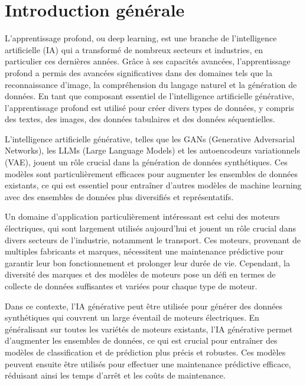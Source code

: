 \chapter*{Introduction générale}
\label{chap:introduction}

L'apprentissage profond, ou deep learning, est une branche de l'intelligence
artificielle (IA) qui a transformé de nombreux secteurs et industries, en
particulier ces dernières années. Grâce à ses capacités avancées,
l'apprentissage profond a permis des avancées significatives dans des domaines
tels que la reconnaissance d'image, la compréhension du langage naturel et la
génération de données. En tant que composant essentiel de l'intelligence
artificielle générative, l'apprentissage profond est utilisé pour créer divers
types de données, y compris des textes, des images, des données tabulaires et
des données séquentielles.

\medskip

L'intelligence artificielle générative, telles que les GANs (Generative
Adversarial Networks), les LLMs (Large Language Models) et les autoencodeurs
variationnels (VAE), jouent un rôle crucial dans la génération de données
synthétiques. Ces modèles sont particulièrement efficaces pour augmenter les
ensembles de données existants, ce qui est essentiel pour entraîner d'autres
modèles de machine learning avec des ensembles de données plus diversifiés et
représentatifs.

\medskip
Un domaine d'application particulièrement intéressant est celui des moteurs électriques,
qui sont largement utilisés aujourd'hui et jouent un rôle crucial dans divers secteurs de l'industrie,
notamment le transport. Ces moteurs, provenant de multiples fabricants et marques, nécessitent une
maintenance prédictive pour garantir leur bon fonctionnement et prolonger leur durée de vie. Cependant,
la diversité des marques et des modèles de moteurs pose un défi en termes de collecte de données suffisantes et
variées pour chaque type de moteur.

\medskip
Dans ce contexte, l'IA générative peut être utilisée pour générer des données
synthétiques qui couvrent un large éventail de moteurs électriques. En généralisant
sur toutes les variétés de moteurs existants, l'IA générative permet d'augmenter les
ensembles de données, ce qui est crucial pour entraîner des modèles de classification
et de prédiction plus précis et robustes. Ces modèles peuvent ensuite être utilisés pour
effectuer une maintenance prédictive efficace, réduisant ainsi les temps d'arrêt et les coûts de maintenance.

